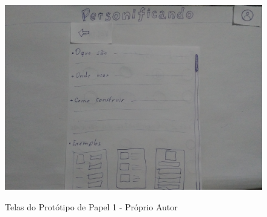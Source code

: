 \begin{apendicesenv}
\begin{figure}[htbp]
{        \includegraphics[keepaspectratio=true,scale=0.055]{figuras/prototype/proto5.jpg}
        \label{Fig:amb.png}
    }
    \quad
	\caption{Telas do Protótipo de Papel 1 - Próprio Autor}
	\label{Fig:proto1.png}
\end{figure}


\end{apendicesenv}

